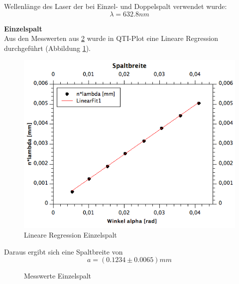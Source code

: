 \documentclass[12pt,a4paper]{article}
\begin{document}
\begin{multicols}{2}
\noindent
Wellenlänge des Laser der bei Einzel- und Doppelspalt verwendet wurde:
$$\lambda = 632.8nm$$

\noindent \textbf{Einzelspalt}\\
Aus den Messwerten aus \ref{tab:werte_einzelspalt} wurde in QTI-Plot eine Lineare Regression durchgeführt (Abbildung \ref{fig:einzelspalt_linreg}). 
\begin{figure}[H]
	\centering
	\includegraphics[scale=0.40]{./figure/linreg_einzelspalt.png}
	\caption{Lineare Regression Einzelspalt}
	\label{fig:einzelspalt_linreg}
\end{figure}
Daraus ergibt sich eine Spaltbreite von 
$$a = (0.1234 \pm 0.0065)mm$$
\begin{figure}[H]
	\centering
	\caption{Messwerte Einzelspalt}
	\label{tab:werte_einzelspalt}
\end{figure}


\end{multicols}
\end{document}
